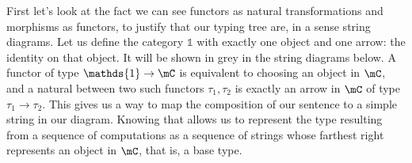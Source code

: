 \documentclass[math, english, info]{cours}
\makeatletter
\def\black@or@white#1#2{%
  \@tempdima#2 pt
  \ifdim\@tempdima>0.5 pt
    \definecolor{temp@c}{gray}{0}%
  \else
    \definecolor{temp@c}{gray}{1}%
  \fi}
\def\letterbox#1#{\protect\letterb@x{#1}}
\def\letterb@x#1#2#3{%
  \colorlet{temp@c}[gray]{#2}%
  \extractcolorspec{temp@c}{\color@spec}%
  \expandafter\black@or@white\color@spec
  {\color#1{temp@c}\tallcbox#1{#2}{#3}}}
\def\tallcbox#1#{\protect\color@box{#1}}
\def\color@box#1#2{\color@b@x\relax{\color#1{#2}}}
\def\backbox#1{\letterbox{Lavender!40}{\contour{black}{#1}}}
\def\ty#1{\backbox{\tt\color{yulm!90!black}#1}}
\def\f#1{\backbox{\tt\color{vulm}#1}}
\def\w#1{\mathbf{#1}\,}
\def\t{\ty{t}}
\makeatother
\begin{document}
\medskip

First let's look at the fact we can see functors as natural transformations and morphisms as functors, to justify that our typing tree are, in a sense string diagrams.
Let us define the category $\mathds{1}$ with exactly one object and one arrow: the identity on that object. It will be shown in grey in the string diagrams below.
A functor of type $\mathds{1} \to \mC$ is equivalent to choosing an object in $\mC$, and a natural between two such functors $\tau_{1}, \tau_{2}$ is exactly an arrow in $\mC$ of type $\tau_{1} \to \tau_{2}$.
This gives us a way to map the composition of our sentence to a simple string in our diagram.
Knowing that allows us to represent the type resulting from a sequence of computations as a sequence of strings whose farthest right represents an object in $\mC$, that is, a base type.
\begin{center}
\end{center}
\end{document}
